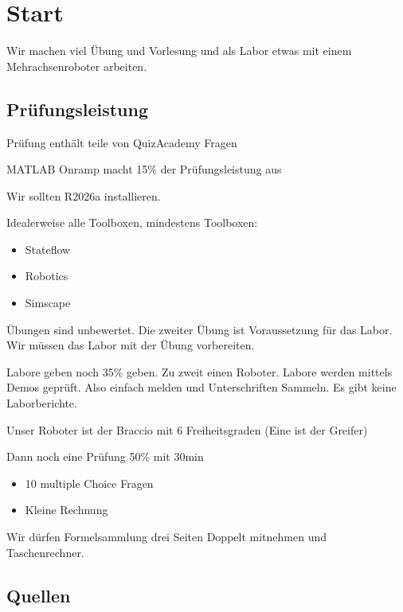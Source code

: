 \documentclass[a4paper]{article}
\title{\docTitle}
\author{Moritz}
\date{\today}
\begin{document}
\maketitle
\tableofcontents


\section{Start}

Wir machen viel Übung und Vorlesung und als Labor etwas mit einem Mehrachsenroboter arbeiten.

\subsection{Prüfungsleistung}

Prüfung enthält teile von QuizAcademy Fragen

MATLAB Onramp macht 15\% der Prüfungsleistung aus

Wir sollten R2026a installieren. 

Idealerweise alle Toolboxen, mindestens Toolboxen:

\begin{itemize}
    \item Stateflow
    \item Robotics
    \item Simscape
\end{itemize}

Übungen sind unbewertet. Die zweiter Übung ist Voraussetzung für das Labor. Wir müssen das Labor mit der Übung vorbereiten.

Labore geben noch 35\% geben. Zu zweit einen Roboter. Labore werden mittels Demos geprüft. Also einfach melden und Unterschriften Sammeln. Es gibt keine Laborberichte.

Unser Roboter ist der Braccio mit 6 Freiheitsgraden (Eine ist der Greifer)

Dann noch eine Prüfung 50\% mit 30min

\begin{itemize}
    \item 10 multiple Choice Fragen
    \item Kleine Rechnung
\end{itemize}

Wir dürfen Formelsammlung drei Seiten Doppelt mitnehmen und Taschenrechner.

\subsection{Quellen}
\end{document}
